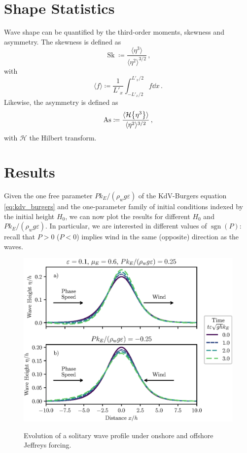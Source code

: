 \documentclass{jfm}
\DeclareMathOperator{\sgn}{sgn}
\DeclareMathOperator{\Sk}{Sk}
\DeclareMathOperator{\As}{As}
\newcommand{\hilbert}{\mathcal{H}}
\renewcommand*{\epsilon}{\varepsilon}
\begin{document}
\section{Shape Statistics}
Wave shape can be quantified by the third-order moments, skewness and
asymmetry.
The skewness is defined as
\begin{equation}
  \Sk \coloneqq \frac{\langle \eta^3 \rangle}{\langle \eta^2
  \rangle^{3/2}} \,,
\end{equation}
with
\begin{equation}
  \langle f \rangle \coloneqq \frac{1}{L'_x} \int_{-L'_x/2}^{L'_x/2} f
  \dd{x} \,.
\end{equation}
Likewise, the asymmetry is defined as
\begin{equation}
  \As \coloneqq \frac{\langle \hilbert \Bqty{\eta^3} \rangle}{\langle
    \eta^2 \rangle^{3/2}} \,,
\end{equation}
with $\hilbert$ the Hilbert transform.

\section{Results}
Given the one free parameter $P k_E/(\rho_w g \epsilon)$ of the
KdV-Burgers equation \cref{eq:kdv_burgers} and the one-parameter family of
initial conditions indexed by the initial height $H_0$, we can now plot the
results for different $H_0$ and $P k_E/(\rho_w g \epsilon)$.
In particular, we are interested in different values of $\sgn(P)$:
recall that $P>0$ ($P<0$) implies wind in the same (opposite) direction
as the waves.

\begin{figure}
  \centering
  { %
    \label{fig:snapshots_solitary:a}
    \label{fig:snapshots_solitary:b}
  }
  \includegraphics{Snapshots-Positive-Negative.eps}
  \caption{
    Evolution of a solitary wave profile under
    onshore and
    offshore Jeffreys forcing.
  }
  \label{fig:snapshots_solitary}
\end{figure}
\end{document}
